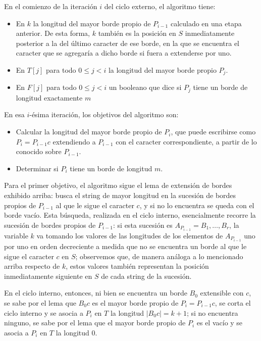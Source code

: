 En el comienzo de la iteración $i$ del ciclo externo, el algoritmo tiene:
\begin{itemize}
\setlength\itemsep{0em}
\item En $k$ la longitud del mayor borde propio de $P_{i-1}$ calculado en una etapa anterior. De esta forma, $k$ también es la posición en $S$ inmediatamente posterior a la del último caracter de ese borde, en la que se encuentra el caracter que se agregaría a dicho borde si fuera a extenderse por uno.
\item En $T[j]$ para todo $0 \leq j < i$ la longitud del mayor borde propio $P_j$.
\item En $F[j]$ para todo $0 \leq j < i$ un booleano que dice si $P_j$ tiene un borde de longitud exactamente $m$
\end{itemize}

En esa $i$-ésima iteración, los objetivos del algoritmo son:
\begin{itemize}
\setlength\itemsep{0em}
\item Calcular la longitud del mayor borde propio de $P_i$, que puede escribirse como $P_i = P_{i-1}c$ extendiendo a $P_{i-1}$ con el caracter correspondiente, a partir de lo conocido sobre $P_{i-1}$.
\item Determinar si $P_i$ tiene un borde de longitud $m$.
\end{itemize}

Para el primer objetivo, el algoritmo sigue el lema de extensión de bordes exhibido arriba: busca el string de mayor longitud en la sucesión de bordes propios de $P_{i-1}$ al que le sigue el caracter $c$, y si no lo encuentra se queda con el borde vacío. Esta búsqueda, realizada en el ciclo interno, esencialmente recorre la sucesión de bordes propios de $P_{i-1}$: si esta sucesión es $A_{P_{i-1}} = B_1, \dots, B_r$, la variable $k$ va tomando los valores de las longitudes de los elementos de $A_{P_{i-1}}$ uno por uno en orden decreciente a medida que no se encuentra un borde al que le sigue el caracter $c$ en $S$; observemos que, de manera análoga a lo mencionado arriba respecto de $k$, estos valores también representan la posición inmediatamente siguiente en $S$ de cada string de la sucesión.

En el ciclo interno, entonces, ni bien se encuentra un borde $B_0$ extensible con $c$, se sabe por el lema que $B_{0}c$ es el mayor borde propio de $P_i = P_{i-1}c$, se corta el ciclo interno y se asocia a $P_i$ en $T$ la longitud $|B_{0}c| = k+1$; si no encuentra ninguno, se sabe por el lema que el mayor borde propio de $P_i$ es el vacío y se asocia a $P_i$ en $T$ la longitud 0.

